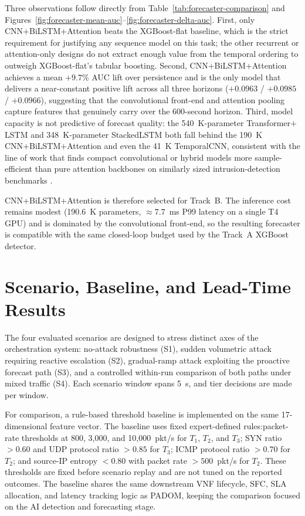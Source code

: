 \documentclass[12pt, a4paper, reqno, oneside]{book}
\newcommand{\padonap}{\textsc{PADOM}}
\newcommand{\tier}[1]{$T_{#1}$}
\begin{document}
Three observations follow directly from
Table~\ref{tab:forecaster-comparison} and
Figures~\ref{fig:forecaster-mean-auc}--\ref{fig:forecaster-delta-auc}. First, only CNN+BiLSTM+Attention beats the XGBoost-flat baseline, which is the strict requirement for justifying any sequence model on this task; the other recurrent or attention-only designs do not extract enough value from the temporal ordering to outweigh XGBoost-flat's tabular boosting. Second, CNN+BiLSTM+Attention achieves a mean $+9.7\%$ AUC lift over persistence and is the only model that delivers a near-constant positive lift across all three horizons ($+0.0963$ / $+0.0985$ / $+0.0966$), suggesting that the convolutional front-end and attention pooling capture features that genuinely carry over the 600-second horizon. Third, model capacity is not predictive of forecast quality: the 540~K-parameter Transformer$+$LSTM and 348~K-parameter StackedLSTM both fall behind the 190~K CNN+BiLSTM+Attention and even the 41~K TemporalCNN, consistent with the line of work that finds compact
convolutional or hybrid models more sample-efficient than pure attention backbones on similarly sized intrusion-detection benchmarks
\cite{alanazi2022ensembleddos, cnnbilstmattn2025}.

CNN+BiLSTM+Attention is therefore selected for Track~B. The inference cost remains modest (190.6~K parameters, $\approx 7.7$~ms P99 latency on a single T4 GPU) and is dominated by the convolutional front-end, so the resulting forecaster is compatible with the same closed-loop budget used by the Track~A XGBoost detector.

\section{Scenario, Baseline, and Lead-Time Results}
\label{sec:results}

The four evaluated scenarios are designed to stress distinct axes of the orchestration system: no-attack robustness (S1), sudden volumetric attack requiring reactive escalation (S2), gradual-ramp attack exploiting the proactive forecast path (S3), and a controlled within-run comparison of both paths under mixed traffic (S4). Each scenario window spans 5~s, and tier decisions are made per window.

For comparison, a rule-based threshold baseline is implemented on the same 17-dimensional feature vector. The baseline uses fixed expert-defined rules:packet-rate thresholds at 800, 3{,}000, and 10{,}000~pkt/s for \tier{1}, \tier{2}, and \tier{3}; SYN ratio $>0.60$ and UDP protocol ratio $>0.85$ for \tier{3}; ICMP protocol ratio $>0.70$ for \tier{2}; and source-IP entropy $<0.80$ with packet rate $>500$~pkt/s for \tier{2}. These thresholds are fixed before scenario replay and are not tuned on the reported outcomes. The baseline shares the same downstream VNF lifecycle, SFC, SLA allocation, and latency tracking logic as \padonap{}, keeping the comparison focused on the AI detection and forecasting stage.
\end{document}
